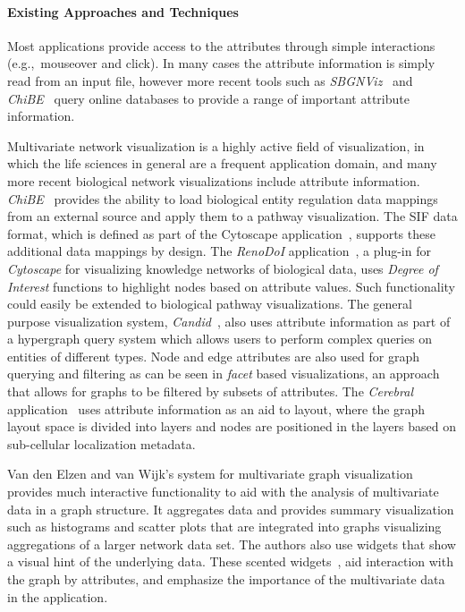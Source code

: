\documentclass[twocolumn]{bmcart}%
\begin{document}
\paragraph*{Existing Approaches and Techniques}

Most applications provide access to the attributes through simple interactions (e.g.,~mouseover and click).
In many cases the attribute information is simply read from an input file, however more recent tools such as \textit{SBGNViz}~\cite{SBGNViz2015} and \textit{ChiBE}~\cite{Babur2010chibe} query online databases to provide a range of important attribute information.

Multivariate network visualization is a highly active field of visualization, in which the life sciences in general are a frequent application domain, and many more recent biological network visualizations include attribute information.
\textit{ChiBE}~\cite{Babur2010chibe} provides the ability to load biological entity regulation data mappings from an external source and apply them to a pathway visualization.
The SIF data format, which is defined as part of the Cytoscape application~\cite{Shannon2003cytoscape}, supports these additional data mappings by design.
The \textit{RenoDoI} application~\cite{Vehlow2015}, a plug-in for \textit{Cytoscape} for visualizing knowledge networks of biological data, uses \emph{Degree of Interest} functions to highlight nodes based on attribute values.
Such functionality could easily be extended to biological pathway visualizations.
The general purpose visualization system, \textit{Candid}~\cite{Shadoan2013}, also uses attribute information as part of a hypergraph query system which allows users to perform complex queries on entities of different types.
Node and edge attributes are also used for graph querying and filtering as can be seen in \textit{facet} based visualizations, an approach that allows for graphs to be filtered by subsets of attributes.
The \textit{Cerebral} application~\cite{Barsky2008cerebral} uses attribute information as an aid to layout, where the graph layout space is divided into layers and nodes are positioned in the layers based on sub-cellular localization metadata.


Van den Elzen and van Wijk’s \cite{van2014multivariate} system for multivariate graph visualization provides much interactive functionality to aid with the analysis of multivariate data in a graph structure. It aggregates data and provides summary visualization such as histograms and scatter plots that are integrated into graphs visualizing aggregations of a larger network data set. The authors also use widgets that show a visual hint of the underlying data. These scented widgets~\cite{willett2007scented}, aid interaction with the graph by attributes, and emphasize  the importance of the multivariate data in the application.
\end{document}
